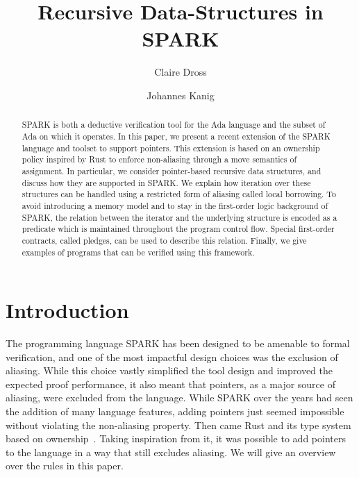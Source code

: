 \documentclass[runningheads]{llncs}
\begin{document}
%
\title{Recursive Data-Structures in SPARK}
%
\author{Claire Dross \and Johannes Kanig}
%
%
%
\maketitle              %
%
\begin{abstract}
SPARK is both a deductive verification tool for the Ada language and the subset of Ada on which it operates. In this paper, we present a recent extension of the SPARK language and toolset to support pointers. This extension is based on an ownership policy inspired by Rust to enforce non-aliasing through a move semantics of assignment. In particular, we consider pointer-based recursive data structures, and discuss how they are supported in SPARK. We explain how iteration over these structures can be handled using a restricted form of aliasing called local borrowing. To avoid introducing a memory model and to stay in the first-order logic background of SPARK, the relation between the iterator and the underlying structure is encoded as a predicate which is maintained throughout the program control flow. Special first-order contracts, called pledges, can be used to describe this relation. Finally, we give examples of programs that can be verified using this framework.

\end{abstract}
%
%
%
\section{Introduction}
The programming language SPARK has been designed to be amenable to formal verification, and one of the most impactful design choices was the exclusion of aliasing. While this choice vastly simplified the tool design and improved the expected proof performance, it also meant that pointers, as a major source of aliasing, were excluded from the language. While SPARK over the years had seen the addition of many language features, adding pointers just seemed impossible without violating the non-aliasing property. %
Then came Rust and its type system based on ownership~\cite{rust}. %
Taking inspiration from it, it was possible to add pointers to the language in a way that still excludes aliasing.
We will give an overview over the rules in this paper.
\end{document}
